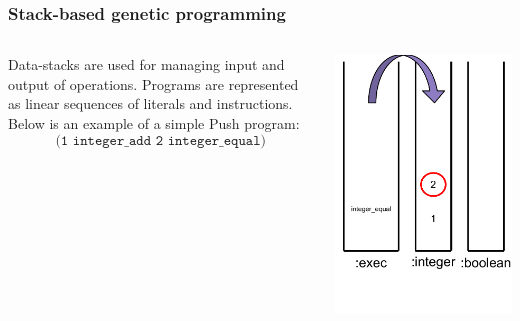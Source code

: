 \documentclass{beamer}
\newcommand{\linespace}{\vskip 0.25cm}
\begin{document}
\begin{frame}
	\frametitle{Stack-based genetic programming}
	\begin{columns}
		\begin{column}{0.65\textwidth}
			Data-stacks are used for managing input and output of operations.
			\linespace
			\linespace
			\linespace
			Programs are represented as linear sequences of literals and instructions. Below is an example of a simple Push program:
			\[\texttt{(1 integer\_add 2 integer\_equal)}\]
		\end{column}
		\begin{column}{0.35\textwidth}
			\includegraphics[height=.7\textheight]{Illustrations/stack_4.PDF}
		\end{column}
	\end{columns}
\end{frame}
\end{document}
